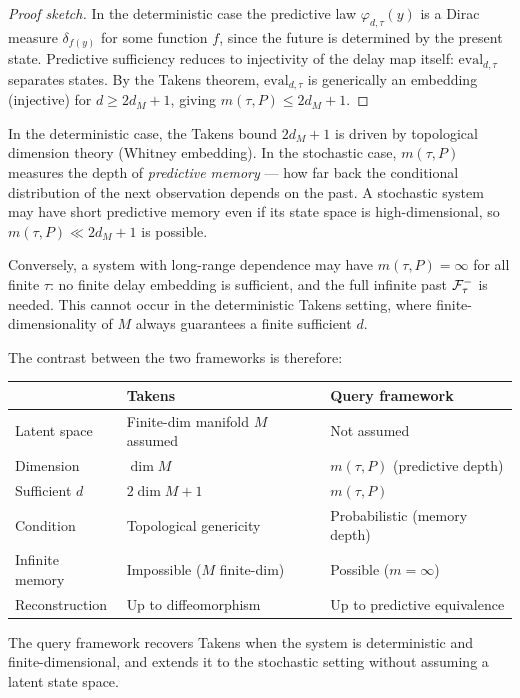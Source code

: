 \begin{proof}[Proof sketch]
In the deterministic case the predictive law $\varphi_{d,\tau}(y)$ is a
Dirac measure $\delta_{f(y)}$ for some function $f$, since the future is
determined by the present state.  Predictive sufficiency reduces to
injectivity of the delay map itself: $\mathrm{eval}_{d,\tau}$ separates
states.  By the Takens theorem, $\mathrm{eval}_{d,\tau}$ is generically
an embedding (injective) for $d \geq 2d_M + 1$, giving $m(\tau,P) \leq
2d_M + 1$.
\end{proof}

\begin{remark}
In the deterministic case, the Takens bound $2d_M + 1$ is driven by
topological dimension theory (Whitney embedding).  In the stochastic case,
$m(\tau, P)$ measures the depth of \emph{predictive memory} — how far back
the conditional distribution of the next observation depends on the past.
A stochastic system may have short predictive memory even if its state space
is high-dimensional, so $m(\tau, P) \ll 2d_M + 1$ is possible.

Conversely, a system with long-range dependence may have $m(\tau, P) = \infty$
for all finite $\tau$: no finite delay embedding is sufficient, and the
full infinite past $\mathcal{F}_\tau^-$ is needed.  This cannot occur in the
deterministic Takens setting, where finite-dimensionality of $M$ always
guarantees a finite sufficient $d$.

The contrast between the two frameworks is therefore:

\begin{center}
\renewcommand{\arraystretch}{1.3}
\begin{tabular}{lll}
\hline
& \textbf{Takens} & \textbf{Query framework} \\
\hline
Latent space & Finite-dim manifold $M$ assumed & Not assumed \\
Dimension & $\dim M$ & $m(\tau, P)$ (predictive depth) \\
Sufficient $d$ & $2\dim M + 1$ & $m(\tau, P)$ \\
Condition & Topological genericity & Probabilistic (memory depth) \\
Infinite memory & Impossible ($M$ finite-dim) & Possible ($m = \infty$) \\
Reconstruction & Up to diffeomorphism & Up to predictive equivalence \\
\hline
\end{tabular}
\end{center}

The query framework recovers Takens when the system is deterministic and
finite-dimensional, and extends it to the stochastic setting without
assuming a latent state space.
\end{remark}

